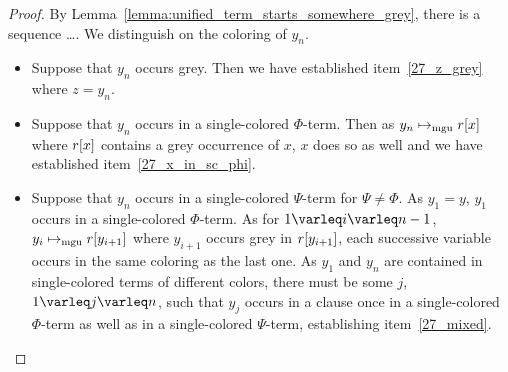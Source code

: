 \documentclass[,%
	draft=false,%
	numbers=noendperiod
	11pt,
	a4paper,
	oneside,%
	openany,
]{memoir}
\begin{document}
\begin{proof}

	By Lemma~\ref{lemma:unified_term_starts_somewhere_grey}, there is a sequence \dots.
	We distinguish on the coloring of $y_n$.

	\begin{itemize}
		\item Suppose that $y_n$ occurs grey. 
			Then we have established item~\ref{27_z_grey} where $z=y_n$.
		\item 
			Suppose that $y_n$ occurs in a single-colored $\Phi$-term.
			Then as $y_n \mapsto_{\operatorname{mgu}} r[x]$ where $r[x]$ contains a grey occurrence of $x$, $x$ does so as well and we have established item~\ref{27_x_in_sc_phi}.
		\item 
			Suppose that $y_n$ occurs in a single-colored $\Psi$-term for $\Psi \neq \Phi$.
			As $y_1 = y$, $y_1$ occurs in a single-colored $\Phi$-term.
			As for $1 \varleq i \varleq n-1$, $y_i \mapsto_{\operatorname{mgu}} r[y_{i+1}]$ where $y_{i+1}$ occurs grey in  $r[y_{i+1}]$, each successive variable occurs in the same coloring as the last one.
			As $y_1$ and $y_n$ are contained in single-colored terms of different colors, there must be some $j$, $1\varleq j\varleq n$, such that $y_j$ occurs in a clause once in a single-colored $\Phi$-term as well as in a single-colored $\Psi$-term, establishing item~\ref{27_mixed}.
			\qedhere
	\end{itemize}


	\begin{comment}

	{\tiny

		We proceed by induction on the number of unifications that the $\mgu$ algorithm applies to $y$.

		Suppose the $\mgu$ algorithm applies $\{ y\mapsto s \}$ and does not change $s$ subsequently.
		Then as $x$ occurs grey in $y\sigma$, $s\occ{y} \mguarr s\occ{r\occ{x}}$, where $r$ contains a grey occurrence of $x$.
		Hence case~\ref{27_x_in_sc_phi} is established.

		Suppose the $\mgu$ algorithm applies $\{ y\mapsto s \}$ and modifies $s$ subsequently.

		If $s$ does not contain $x$, then it contains a variable $v$ such that $x$ occurs grey in $v\sigma$.

	}
\end{comment}
\end{proof}
\end{document}
